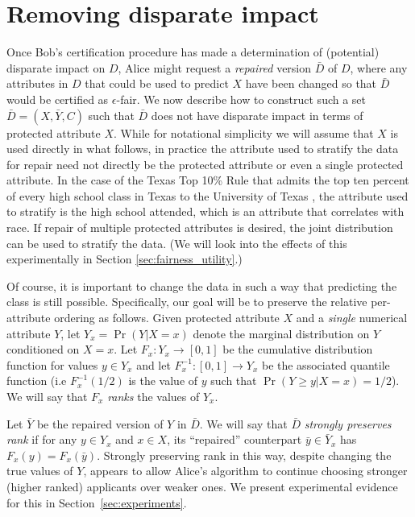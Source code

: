 \section{Removing disparate impact}
\label{sec:repairing-data}

Once Bob's certification procedure has made a determination of (potential) disparate impact on $D$, Alice might request a \emph{repaired} version $\bar{D}$ of $D$, where any attributes in $D$ that could be used to predict $X$ have been changed so that $\bar{D}$ would be certified as $\epsilon$-fair.  %
We now describe how to construct such a set  $\bar{D} = (X, \bar{Y}, C)$ such that $\bar{D}$ does not have disparate impact in terms of protected attribute $X$.  While for notational simplicity we will assume that $X$ is used directly in what follows, in practice the attribute used to stratify the data for repair need not directly be the protected attribute or even a single protected attribute.  In the case of the Texas Top 10\% Rule that admits the top ten percent of every high school class in Texas to the University of Texas \cite{Texas97Top10Percent}, the attribute used to stratify is the high school attended, which is an attribute that correlates with race.  
If repair of multiple protected attributes is desired, the joint distribution can be used to stratify the data.  (We will look into the effects of this experimentally in Section \ref{sec:fairness_utility}.)


Of course, it is important to change the data in such a way that predicting the class is still possible.  Specifically, our goal will be to preserve the relative per-attribute ordering as follows.  Given protected attribute $X$ and a \emph{single} numerical attribute $Y$, let $Y_x = \Pr(Y|X = x)$ denote the marginal distribution on $Y$ conditioned on $X = x$.  Let $F_x: Y_x \to [0,1]$ be the cumulative distribution function for values $y \in Y_x$ and let $F^{-1}_x: [0,1] \to Y_x$ be the associated quantile function (i.e $F^{-1}_x(1/2)$ is the value of $y$ such that $\Pr(Y \ge y|X = x) = 1/2$).
We will say that $F_x$ \emph{ranks} the values of $Y_x$.

Let $\bar{Y}$ be the repaired version of $Y$ in $\bar{D}$.  We will say that $\bar{D}$ \emph{strongly preserves rank} if for any $y \in Y_x$ and $x \in X$, its ``repaired'' counterpart $\bar{y} \in \bar{Y}_x$ has $F_x(y) = F_x(\bar{y})$. Strongly preserving rank in this way, despite changing the true values of $Y$, appears to allow Alice's algorithm to continue choosing stronger (higher ranked) applicants over weaker ones. We present experimental evidence for this in Section~\ref{sec:experiments}.

